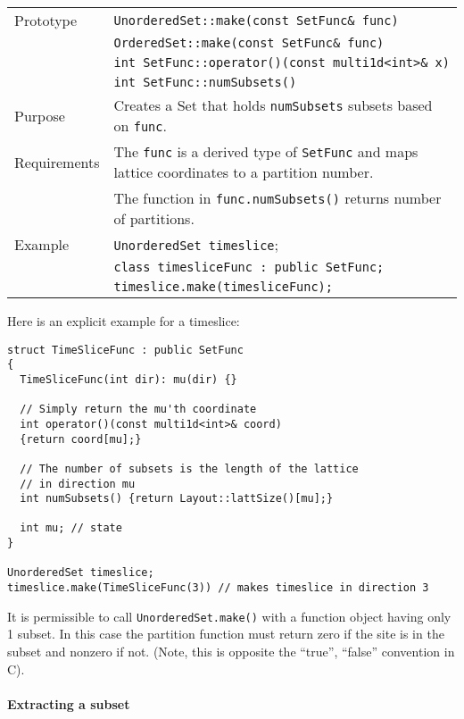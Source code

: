\documentclass[12pt,letterpaper]{article}
\begin{document}
\begin{flushleft}
\begin{tabular}{|l|p{5.0in}|}
\hline
Prototype    & \verb|UnorderedSet::make(const SetFunc& func)|\\
             & \verb|OrderedSet::make(const SetFunc& func)|\\
             & \verb|int SetFunc::operator()(const multi1d<int>& x)|\\
             & \verb|int SetFunc::numSubsets()|\\
\hline
Purpose      & Creates a Set that holds \verb|numSubsets| subsets based on \verb|func|.\\
\hline
Requirements & The \verb|func| is a derived type of \verb|SetFunc| and
               maps lattice coordinates to a partition number.\\
             & The function in \verb|func.numSubsets()| returns number of partitions.\\
\hline
Example  & \verb|UnorderedSet timeslice|; \\
         & \verb|class timesliceFunc : public SetFunc;| \\
         & \verb|timeslice.make(timesliceFunc);| \\
   \hline
  \end{tabular}
\end{flushleft}
%
Here is an explicit example for a timeslice:
%
\begin{verbatim}
struct TimeSliceFunc : public SetFunc
{
  TimeSliceFunc(int dir): mu(dir) {}

  // Simply return the mu'th coordinate
  int operator()(const multi1d<int>& coord)
  {return coord[mu];}

  // The number of subsets is the length of the lattice
  // in direction mu
  int numSubsets() {return Layout::lattSize()[mu];}

  int mu; // state
}

UnorderedSet timeslice;
timeslice.make(TimeSliceFunc(3)) // makes timeslice in direction 3
\end{verbatim}

It is permissible to call \verb|UnorderedSet.make()| with a function object
having only 1 subset.  In this case the partition function must return
zero if the site is in the subset and nonzero if not.  (Note, this is
opposite the ``true'', ``false'' convention in C).

\paragraph{Extracting a subset}
\end{document}
